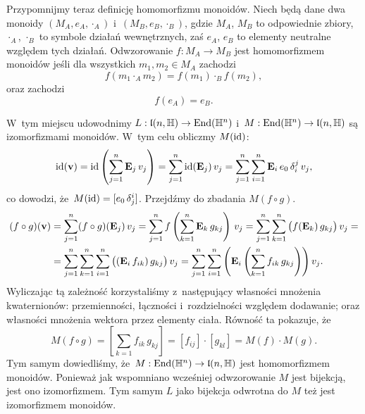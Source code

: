 \documentclass[a4paper,11pt]{article}
\begin{document}
Przypomnijmy teraz definicję homomorfizmu monoidów. Niech będą dane dwa
monoidy $( M_{ A }, e_{ A }, \cdot_{ A } )$ i~$( M_{ B }, e_{ B }, \cdot_{ B } )$, gdzie
$M_{ A }$, $M_{ B }$ to odpowiednie zbiory, $\cdot_{ A }$, $\cdot_{ B }$ to symbole
działań wewnętrznych, zaś $e_{ A }$, $e_{ B }$ to elementy neutralne względem
tych działań. Odwzorowanie $f : M_{ A } \to M_{ B }$ jest homomorfizmem
monoidów jeśli dla wszystkich $m_{ 1 }, m_{ 2 } \in M_{ A }$ zachodzi
\begin{equation}
  \label{eq:Wojtynski-81}
  f( m_{ 1 } \cdot_{ A } m_{ 2 } ) = f( m_{ 1 } ) \cdot_{ B } f( m_{ 2 } ),
\end{equation}
oraz zachodzi
\begin{equation}
  \label{eq:Wojtynski-82}
  f( e_{ A } ) = e_{ B }.
\end{equation}

W~tym miejscu udowodnimy $L : \mathfrak{l}( n, \mathbb{H} ) \to \mathrm{End}( \mathbb{H}^{ n } )$
i~$M : \mathrm{End}( \mathbb{H}^{ n } ) \to \mathfrak{l}( n, \mathbb{H} )$ są izomorfizmami monoidów.
W~tym celu obliczmy $M( \mathrm{id} )$:
\begin{equation}
  \label{eq:Wojtynski-83}
  \mathrm{id}( \mathbf{v} ) =
  \mathrm{id}\left( \sum_{ j = 1 }^{ n } \mathbf{E}_{ j } \, v_{ j } \right) =
  \sum_{ j = 1 }^{ n } \mathrm{id}( \mathbf{E}_{ j } ) \, v_{ j } =
  \sum_{ j = 1 }^{ n } \sum_{ i = 1 }^{ n } \mathbf{E}_{ i } \, e_{ 0 } \,
  \delta^{ j }_{ i } \, v_{ j },
\end{equation}
co dowodzi, że~$M( \mathrm{id} ) = [ e_{ 0 } \, \delta^{ i }_{ j } ]$. Przejdźmy do
zbadania $M( f \circ g )$.
\begin{equation}
  \label{eq:Wojtynski-84}
  \begin{split}
    ( f \circ g )( \mathbf{v} )
    &=
      \sum_{ j = 1 }^{ n } ( f \circ g )( \mathbf{E}_{ j } ) \, v_{ j } =
      \sum_{ j = 1 }^{ n } f\left(
      \sum_{ k = 1 }^{ n } \mathbf{E}_{ k } \, g_{ k j } \right) \, v_{ j } =
      \sum_{ j = 1 }^{ n } \sum_{ k = 1 }^{ n }
      \big( f( \mathbf{E}_{ k } ) \, g_{ k j } \big) \, v_{ j } = \\
    &=
      \sum_{ j = 1 }^{ n } \sum_{ k = 1 }^{ n } \sum_{ i = 1 }^{ n }
      \big( ( \mathbf{E}_{ i } \, f_{ i k } ) \, g_{ k j } \big) \, v_{ j } =
      \sum_{ j = 1 }^{ n } \sum_{ i = 1 }^{ n }
      \left( \mathbf{E}_{ i } \left( \sum_{ k = 1 }^{ n } f_{ i k } \, g_{ k j }
      \right) \right) v_{ j }.
  \end{split}
\end{equation}
Wyliczając tą zależność korzystaliśmy z~następujący własności mnożenia
kwaternionów: przemienności, łączności i~rozdzielności względem dodawanie;
oraz własności mnożenia wektora przez elementy ciała. Równość ta pokazuje,
że
\begin{equation}
  \label{eq:Wojtynski-85}
  M( f \circ g ) = \left[ \sum_{ k = 1 } f_{ i k } \, g_{ k j } \right] =
  [ f_{ i j } ] \cdot [ g_{ k l } ] = M( f ) \cdot M( g ).
\end{equation}
Tym samym dowiedliśmy, że~$M : \mathrm{End}( \mathbb{H}^{ n } ) \to \mathfrak{l}( n, \mathbb{H} )$ jest
homomorfizmem monoidów. Ponieważ jak wspomniano wcześniej odwzorowanie $M$
jest bijekcją, jest ono izomorfizmem. Tym samym $L$ jako bijekcja odwrotna
do $M$ też jest izomorfizmem monoidów.
\end{document}
